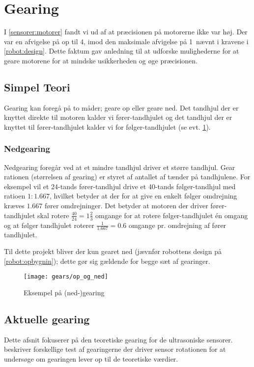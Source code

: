 \section{Gearing}\label{robot:gearing}
I \cref{sensorer:motorer} fandt vi ud af at præcisionen på motorerne ikke var høj.
Der var en afvigelse på op til 4\dg, imod den maksimale afvigelse på 1\dg ~nævnt i kravene i \cref{robot:design}.
Dette faktum gav anledning til at udforske mulighederne for at geare motorene for at mindske usikkerheden og øge præcisionen.

\subsection{Simpel Teori}\label{gearing:simpel_teori}
Gearing kan foregå på to måder; geare op eller geare ned.
Det tandhjul der er knyttet direkte til motoren kalder vi fører-tandhjulet og det tandhjul der er knyttet til fører-tandhjulet kalder vi for følger-tandhjulet (se evt. \cref{gearing:nedgearing}).

\subsubsection{Nedgearing}
Nedgearing foregår ved at et mindre tandhjul driver et større tandhjul.
Gear rationen (størrelsen af gearing) er styret af antallet af tænder på tandhjulene.
For eksempel vil et 24-tands fører-tandhjul drive et 40-tands følger-tandhjul med ratioen $1:1.667$, hvilket betyder at der for at give en enkelt følger omdrejning kræves $1.667$ fører omdrejninger. 
Det betyder at motoren der driver fører-tandhjulet skal rotere $\frac{40}{24} = 1 \frac{2}{3}$ omgange for at rotere følger-tandhjulet én omgang og at følger tandhjulet roterer $\frac{1}{1.667} = 0.6$ omgange pr. omdrejning af fører tandhjulet.

Til dette projekt bliver der kun gearet ned (jævnfør robottens design på \cref{robot:opbygnin}); dette gør sig gældende for begge sæt af gearinger.


\begin{figure}[h]
\centering
\texttt{[image: gears/op\_og\_ned]}
\caption{Eksempel på (ned-)gearing}
\label{gearing:nedgearing}
\end{figure}

\subsection{Aktuelle gearing}
Dette afsnit fokuserer på den teoretiske gearing for de ultrasoniske sensorer.
 beskriver forskellige test af gearingerne der driver sensor rotationen for at undersøge om gearingen lever op til de teoretiske værdier.


